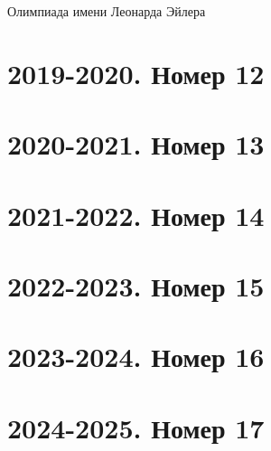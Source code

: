 \documentclass[11pt, a4paper]{common/document_template}
\begin{document}
\begin{titlepage}
  \begin{center}
	\Huge{Олимпиада имени Леонарда Эйлера}
  \end{center}
\end{titlepage} 

\chapter{2019-2020. Номер 12}
\chapter{2020-2021. Номер 13}
\chapter{2021-2022. Номер 14}
\chapter{2022-2023. Номер 15}
\chapter{2023-2024. Номер 16}
\chapter{2024-2025. Номер 17}
\end{document}
